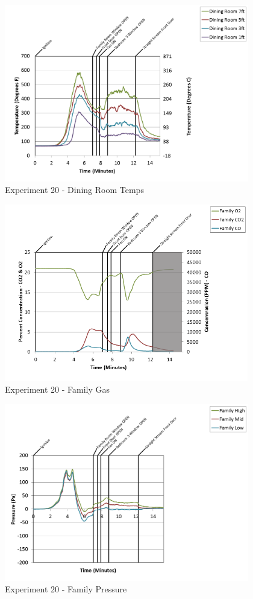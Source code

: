 \documentclass{article}
\begin{document}
\begin{appendices}
\begin{figure}[h!]
	\centering
	\includegraphics[height=3.05in]{0_Images/Results_Charts/Exp_20_Charts/DiningRoomTemps.png}
	\caption{Experiment 20 - Dining Room Temps}
\end{figure}

\clearpage

\begin{figure}[h!]
	\centering
	\includegraphics[height=3.05in]{0_Images/Results_Charts/Exp_20_Charts/FamilyGas.png}
	\caption{Experiment 20 - Family Gas}
\end{figure}


\begin{figure}[h!]
	\centering
	\includegraphics[height=3.05in]{0_Images/Results_Charts/Exp_20_Charts/FamilyPressure.png}
	\caption{Experiment 20 - Family Pressure}
\end{figure}


\end{appendices}
\end{document}
